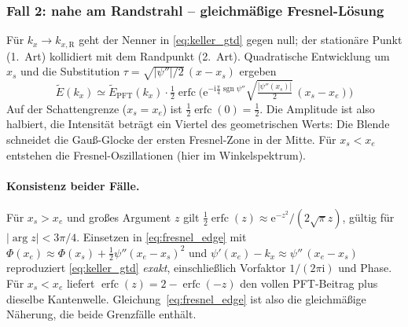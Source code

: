 \documentclass[11pt,a4paper]{scrartcl}
\theoremstyle{insightstyle}
\newcommand{\ii}{\mathrm{i}}
\newcommand{\ee}{\mathrm{e}}
\DeclareMathOperator{\sgn}{sgn}
\DeclareMathOperator{\erfc}{erfc}
\begin{document}
\subsubsection{Fall 2: nahe am Randstrahl -- gleichmäßige Fresnel-Lösung}
Für $k_x\to k_{x,\text{R}}$ geht der Nenner in \eqref{eq:keller_gtd} gegen null; der stationäre Punkt (1.~Art) kollidiert mit dem Randpunkt (2.~Art). Quadratische Entwicklung um $x_s$ und die Substitution $\tau=\sqrt{|\psi''|/2}\,(x-x_s)$ ergeben
\begin{equation}
    \boxed{\;\tilde E(k_x) \simeq \tilde E_\text{PFT}(k_x)\cdot\tfrac12\erfc\!\Big(\ee^{-\ii\frac\pi4\sgn\psi''}\sqrt{\tfrac{|\psi''(x_s)|}{2}}\,(x_s-x_e)\Big)\;}
    \label{eq:fresnel_edge}
\end{equation}
Auf der Schattengrenze ($x_s=x_e$) ist $\tfrac12\erfc(0)=\tfrac12$. Die Amplitude ist also halbiert, die Intensität beträgt ein Viertel des geometrischen Werts: Die Blende schneidet die Gauß-Glocke der ersten Fresnel-Zone in der Mitte. Für $x_s<x_e$ entstehen die Fresnel-Oszillationen (hier im Winkelspektrum).

\paragraph{Konsistenz beider Fälle.} Für $x_s>x_e$ und großes Argument $z$ gilt $\tfrac12\erfc(z)\approx\ee^{-z^2}/(2\sqrt\pi z)$, gültig für $|\arg z|<3\pi/4$. Einsetzen in \eqref{eq:fresnel_edge} mit $\Phi(x_e)\approx\Phi(x_s)+\tfrac12\psi''(x_e-x_s)^2$ und $\psi'(x_e)-k_x\approx\psi''\,(x_e-x_s)$ reproduziert \eqref{eq:keller_gtd} \emph{exakt}, einschließlich Vorfaktor $1/(2\pi\ii)$ und Phase. Für $x_s<x_e$ liefert $\erfc(z)=2-\erfc(-z)$ den vollen PFT-Beitrag plus dieselbe Kantenwelle. Gleichung~\eqref{eq:fresnel_edge} ist also die gleichmäßige Näherung, die beide Grenzfälle enthält.
\end{document}
